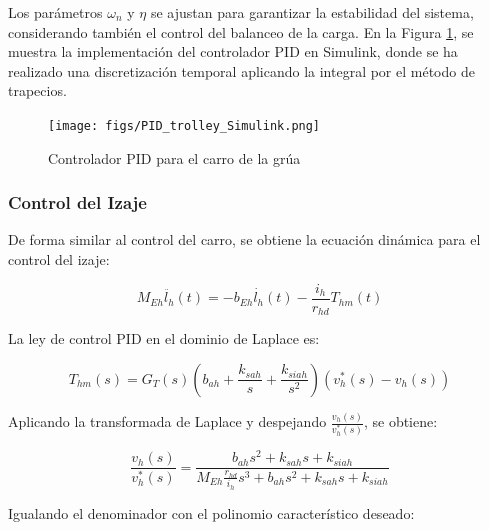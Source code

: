 \documentclass{article}
\begin{document}
            Los parámetros $\omega_n$ y $\eta$ se ajustan para garantizar la estabilidad del sistema, considerando también el control del balanceo de la carga. En la Figura \ref{fig:pid_trolley_simulink}, se muestra la implementación del controlador PID en Simulink, donde se ha realizado una discretización temporal aplicando la integral por el método de trapecios.
            
            \begin{figure}[H]
                \centering
                \texttt{[image: figs/PID\_trolley\_Simulink.png]}
                \caption{Controlador PID para el carro de la grúa}
                \label{fig:pid_trolley_simulink}
            \end{figure}
            


        \subsubsection{Control del Izaje}

            De forma similar al control del carro, se obtiene la ecuación dinámica para el control del izaje:
            
            \begin{equation}
                M_{Eh} \ddot{l_h}(t) = -b_{Eh} \dot{l_h}(t) - \frac{i_h}{r_{hd}} T_{hm}(t)
            \end{equation}
            
            La ley de control PID en el dominio de Laplace es:
            
            \begin{equation}
                T_{hm}(s) = G_T(s) \left( b_{ah} + \frac{k_{sah}}{s} + \frac{k_{siah}}{s^2} \right) \left( v_h^*(s) - v_h(s) \right)
            \end{equation}
            
            Aplicando la transformada de Laplace y despejando \(\frac{v_h(s)}{v_h^*(s)}\), se obtiene:
            
            \begin{equation}
                \frac{v_h(s)}{v_h^*(s)} = \frac{b_{ah} s^2 + k_{sah} s + k_{siah}}{M_{Eh} \frac{r_{hd}}{i_h} s^3 + b_{ah} s^2 + k_{sah} s + k_{siah}}
            \end{equation}
            
            Igualando el denominador con el polinomio característico deseado:
            
\end{document}
